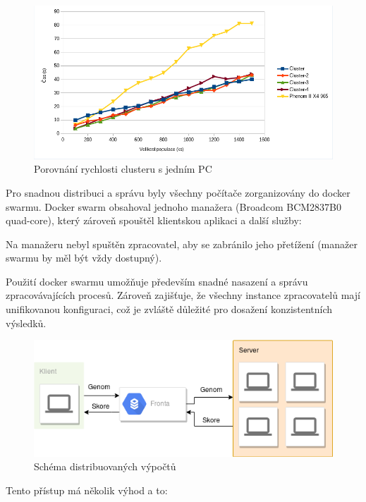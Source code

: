 \begin{figure}[H]
	\centering
	\includegraphics[scale=0.7]{benchmarkCluster}
	\caption{Porovnání rychlosti clusteru s jedním PC}
	\label{fig:benchmarkcluster}
\end{figure}

Pro snadnou distribuci a správu byly všechny počítače zorganizovány do docker swarmu. Docker swarm obsahoval jednoho manažera (Broadcom BCM2837B0 quad-core), který zároveň spouštěl klientskou aplikaci a další služby:

Na manažeru nebyl spuštěn zpracovatel, aby se zabránilo jeho přetížení (manažer swarmu by měl být vždy dostupný).

Použití docker swarmu umožňuje především snadné nasazení a správu zpracovávajících procesů. Zároveň zajišťuje, že všechny instance zpracovatelů mají unifikovanou konfiguraci, což je zvláště důležité pro dosažení konzistentních výsledků.

\begin{figure}[H]
	\centering
	\includegraphics[scale=0.5]{distributed}
	\caption[Schéma distribuovaných výpočtů]{Schéma distribuovaných výpočtů}
	\label{fig:distributed}
\end{figure}

Tento přístup má několik výhod a to:


